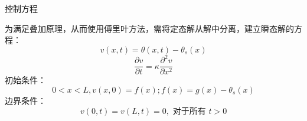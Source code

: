 \documentclass[10pt]{beamer}
\begin{document}
\begin{frame}[allowframebreaks]{控制方程}

为满足叠加原理，从而使用傅里叶方法，需将定态解从解中分离，建立瞬态解的方程：
\begin{equation}
v(x, t)=\theta(x, t)-\theta_{s}(x)
\end{equation}	
\begin{equation}
\frac{\partial v}{\partial t}=\kappa \frac{\partial^{2} v}{\partial x^{2}}
\end{equation}
初始条件：
\begin{equation}
0<x<L, v(x, 0)=f(x) ; f(x)=g(x)-\theta_{s}(x)
\end{equation}
边界条件：
\begin{equation}
v(0, t)=v(L, t)=0, \text { 对于所有 } t>0
\end{equation}


\end{frame}
\end{document}
